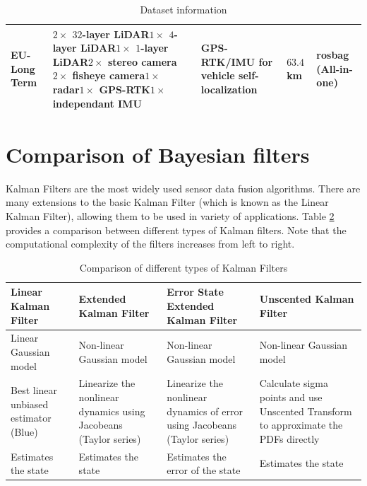 \begin{table}[h]
\begin{tabular}{ |p{}|p{}|p{}|p{}|p{}|  }
	\hline
	EU-Long Term & $2\times$ $32$-layer LiDAR\newline $1\times$ $4$-layer LiDAR\newline $1\times$ $1$-layer LiDAR\newline $2\times$ stereo camera \newline $2\times$ fisheye camera\newline $1\times$ radar\newline $1\times$ GPS-RTK\newline $1\times$ independant IMU\newline & GPS-RTK/IMU for vehicle self-localization & $63.4$ km & rosbag (All-in-one)\\
	\hline
\end{tabular}
\caption{Dataset information}
\label{table:pa:Datasets}
\end{table}








\section{Comparison of Bayesian filters}
Kalman Filters are the most widely used sensor data fusion algorithms. There 
are many extensions to the basic Kalman Filter (which is known as the Linear Kalman Filter), allowing them to be used in variety of applications. Table \ref{table:ch:KalmanFilterComparison} provides a 
comparison between different types of Kalman filters. Note that the computational complexity of the filters increases from left to right.
\begin{table}[h]
	\centering
	\begin{tabular}{|p{3.4cm}|p{3.4cm}|p{3.4cm}|p{3.4cm}|} 
		\hline
		\textbf{Linear Kalman Filter} & \textbf{Extended Kalman Filter} & \textbf{Error State Extended Kalman Filter} & \textbf{Unscented Kalman Filter} \\
		\hline
		Linear Gaussian model&Non-linear Gaussian model&Non-linear  Gaussian model&Non-linear Gaussian model\\
		\hline
		Best linear unbiased estimator (Blue)&Linearize the nonlinear dynamics using Jacobeans (Taylor series)&Linearize the nonlinear 
		dynamics of error using Jacobeans (Taylor series)&Calculate sigma points and use Unscented Transform to approximate the \gls{PDF}s directly\\
		\hline
		Estimates the state & Estimates the state& Estimates the error of the state & Estimates the state\\
		\hline
	\end{tabular}
	\caption{Comparison of different types of Kalman Filters}
	\label{table:ch:KalmanFilterComparison}
\end{table}

